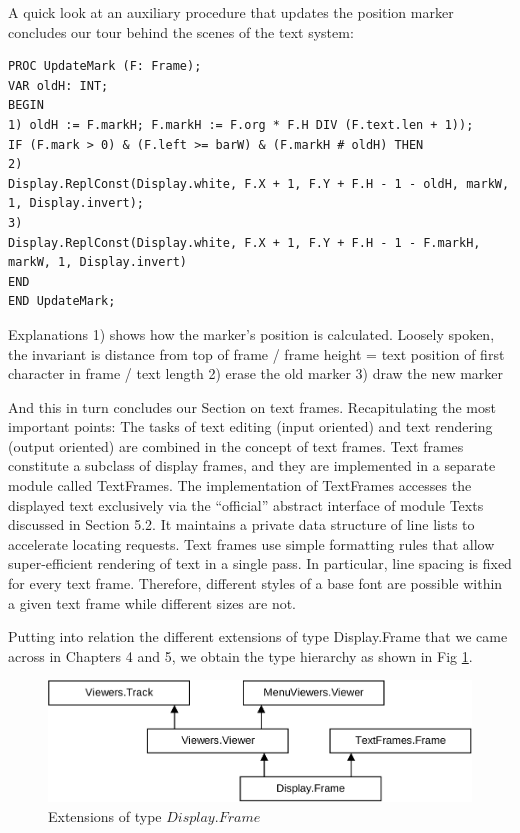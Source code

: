 A quick look at an auxiliary procedure that updates the position marker concludes our tour behind
the scenes of the text system:
\begin{verbatim}
PROC UpdateMark (F: Frame);
VAR oldH: INT;
BEGIN
1) oldH := F.markH; F.markH := F.org * F.H DIV (F.text.len + 1));
IF (F.mark > 0) & (F.left >= barW) & (F.markH # oldH) THEN
2)
Display.ReplConst(Display.white, F.X + 1, F.Y + F.H - 1 - oldH, markW, 1, Display.invert);
3)
Display.ReplConst(Display.white, F.X + 1, F.Y + F.H - 1 - F.markH, markW, 1, Display.invert)
END
END UpdateMark;
\end{verbatim}

Explanations
1) shows how the marker's position is calculated. Loosely spoken, the invariant is
distance from top of frame / frame height = text position of first character in frame / text length
2) erase the old marker
3) draw the new marker

And this in turn concludes our Section on text frames. Recapitulating the most important points: The
tasks of text editing (input oriented) and text rendering (output oriented) are combined in the
concept of text frames. Text frames constitute a subclass of display frames, and they are
implemented in a separate module called TextFrames. The implementation of TextFrames
accesses the displayed text exclusively via the “official” abstract interface of module Texts
discussed in Section 5.2. It maintains a private data structure of line lists to accelerate locating
requests. Text frames use simple formatting rules that allow super-efficient rendering of text in a
single pass. In particular, line spacing is fixed for every text frame. Therefore, different styles of a
base font are possible within a given text frame while different sizes are not.

Putting into relation the different extensions of type Display.Frame that we came across in Chapters
4 and 5, we obtain the type hierarchy as shown in Fig \ref{fig:extensions}.
\begin{figure}
  \label{fig:extensions}
  \centering
  \includegraphics[width=\textwidth]{i/h}
  \caption{Extensions of type $Display.Frame$}
\end{figure}
